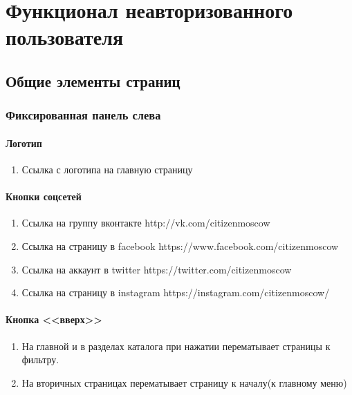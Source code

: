 \chapter{Функционал неавторизованного пользователя}
    \section{Общие элементы страниц}
        \subsection{Фиксированная панель слева}
            \label{baseitems_fixleft_panel}
            \subsubsection{Логотип}
                \begin{enumerate}
                    \item Ссылка с логотипа на главную страницу
                \end{enumerate}
            \subsubsection{Кнопки соцсетей}
                \begin{enumerate}
                    \item Ссылка на группу вконтакте http://vk.com/citizenmoscow
                    \item Ссылка на страницу в facebook https://www.facebook.com/citizenmoscow
                    \item Ссылка на аккаунт в twitter https://twitter.com/citizenmoscow
                    \item Ссылка на страницу в instagram https://instagram.com/citizenmoscow/
                \end{enumerate}
            \subsubsection{Кнопка <<вверх>>}
                \begin{enumerate}
                    \item На главной и в разделах каталога при нажатии перематывает страницы к фильтру. 
                    \item На вторичных страницах перематывает страницу к началу(к главному меню)
                \end{enumerate}
